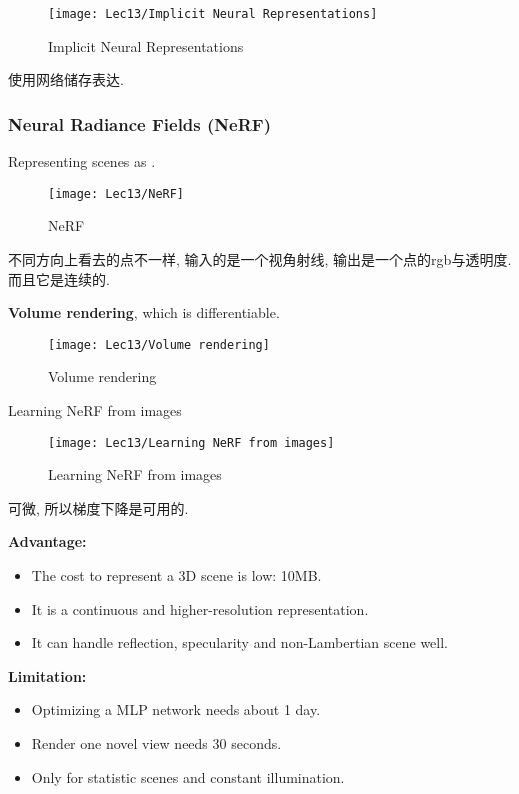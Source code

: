 \begin{figure}[H]
    \centering
    \texttt{[image: Lec13/Implicit Neural Representations]}
    \caption{Implicit Neural Representations}
\end{figure}

使用网络储存表达. 

\subsubsection*{Neural Radiance Fields (NeRF)}
Representing scenes as . 

\begin{figure}[H]
    \centering
    \texttt{[image: Lec13/NeRF]}
    \caption{NeRF}
\end{figure}

不同方向上看去的点不一样, 输入的是一个视角射线, 输出是一个点的rgb与透明度. 而且它是连续的. 

\textbf{Volume rendering}, which is differentiable. 

\begin{figure}[H]
    \centering
    \texttt{[image: Lec13/Volume rendering]}
    \caption{Volume rendering}
\end{figure}

Learning NeRF from images
\begin{figure}[H]
    \centering
    \texttt{[image: Lec13/Learning NeRF from images]}
    \caption{Learning NeRF from images}
\end{figure}
可微, 所以梯度下降是可用的. 

\textbf{Advantage: }
\begin{itemize}
    \item The cost to represent a 3D scene is low: 10MB. 
    \item It is a continuous and higher-resolution representation. 
    \item It can handle reflection, specularity and non-Lambertian scene well. 
\end{itemize}

\textbf{Limitation: }
\begin{itemize}
    \item Optimizing a MLP network needs about 1 day. 
    \item Render one novel view needs 30 seconds. 
    \item Only for statistic scenes and constant illumination. 
\end{itemize}

